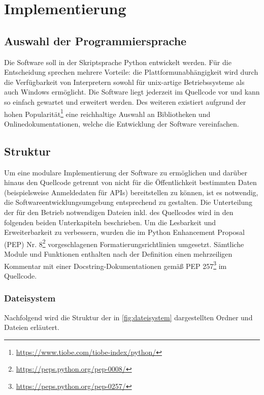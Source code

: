\chapter{Implementierung}
\label{cha:implementierung}

\section{Auswahl der Programmiersprache}

Die Software soll in der Skriptsprache Python entwickelt werden. Für die Entscheidung sprechen mehrere Vorteile: die Plattformunabhängigkeit wird durch die Verfügbarkeit von Interpretern sowohl für unix-artige Betriebssysteme als auch Windows ermöglicht. Die Software liegt jederzeit im Quellcode vor und kann so einfach gewartet und erweitert werden. Des weiteren existiert aufgrund der hohen Popularität\footnote{\url{https://www.tiobe.com/tiobe-index/python/}} eine reichhaltige Auswahl an Bibliotheken und Onlinedokumentationen, welche die Entwicklung der Software vereinfachen. 

\section{Struktur}

Um eine modulare Implementierung der Software zu ermöglichen und darüber hinaus den Quellcode getrennt von nicht für die Öffentlichkeit bestimmten Daten (beispielsweise Anmeldedaten für APIs) bereitstellen zu können, ist es notwendig, die Softwareentwicklungsumgebung entsprechend zu gestalten. Die Unterteilung der für den Betrieb notwendigen Dateien inkl. des Quellcodes wird in den folgenden beiden Unterkapiteln beschrieben. Um die Lesbarkeit und Erweiterbarkeit zu verbessern, wurden die im Python Enhancement Proposal (PEP) Nr. 8\footnote{\url{https://peps.python.org/pep-0008/}} vorgeschlagenen Formatierungsrichtlinien umgesetzt. Sämtliche Module und Funktionen enthalten nach der Definition einen mehrzeiligen Kommentar mit einer Docstring-Dokumentationen gemäß PEP 257\footnote{\url{https://peps.python.org/pep-0257/}} im Quellcode.

\subsection{Dateisystem}

Nachfolgend wird die Struktur der in \autoref{fig:dateisystem} dargestellten Ordner und Dateien erläutert.

